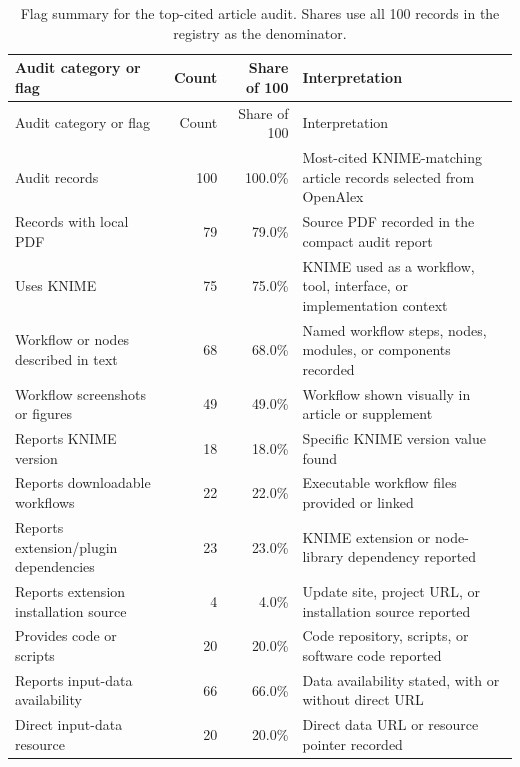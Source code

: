 \documentclass[runningheads]{llncs}
\begin{document}
\begingroup
\scriptsize
\renewcommand{\arraystretch}{1.18}
\begin{longtable}{|%
  >{\raggedright\arraybackslash}p{}|
  r|
  r|
  >{\raggedright\arraybackslash}p{}|}
\caption{Flag summary for the top-cited article audit. Shares use all
100 records in the registry as the denominator.}
\label{tab:top-cited-assessment}\\
\toprule
Audit category or flag & Count & Share of 100 & Interpretation \\
\midrule
\endfirsthead
\toprule
Audit category or flag & Count & Share of 100 & Interpretation \\
\midrule
\endhead
\bottomrule
\endfoot
Audit records & 100 & 100.0\% & Most-cited KNIME-matching article records selected from OpenAlex \\
Records with local PDF & 79 & 79.0\% & Source PDF recorded in the compact audit report \\
\midrule
Uses KNIME & 75 & 75.0\% & KNIME used as a workflow, tool, interface, or implementation context \\
Workflow or nodes described in text & 68 & 68.0\% & Named workflow steps, nodes, modules, or components recorded \\
Workflow screenshots or figures & 49 & 49.0\% & Workflow shown visually in article or supplement \\
Reports KNIME version & 18 & 18.0\% & Specific KNIME version value found \\
Reports downloadable workflows & 22 & 22.0\% & Executable workflow files provided or linked \\
Reports extension/plugin dependencies & 23 & 23.0\% & KNIME extension or node-library dependency reported \\
Reports extension installation source & 4 & 4.0\% & Update site, project URL, or installation source reported \\
\midrule
Provides code or scripts & 20 & 20.0\% & Code repository, scripts, or software code reported \\
Reports input-data availability & 66 & 66.0\% & Data availability stated, with or without direct URL \\
Direct input-data resource & 20 & 20.0\% & Direct data URL or resource pointer recorded \\
\end{longtable}
\endgroup
\end{document}
